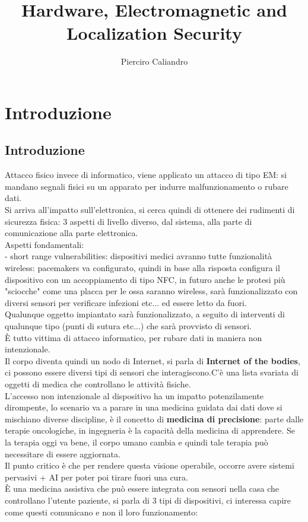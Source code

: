 \documentclass[oneside, 12pt]{extbook}
\title{Hardware, Electromagnetic and Localization Security}
\author{Pierciro Caliandro}
\begin{document}
\maketitle
\chapter{Introduzione}
\section{Introduzione}
Attacco fisico invece di informatico, viene applicato un attacco di tipo EM: si mandano segnali fisici su un apparato per indurre malfunzionamento o rubare dati.\\Si arriva all'impatto sull'elettronica, si cerca quindi di ottenere dei rudimenti di sicurezza fisica: 3 aspetti di livello diverso, dal sistema, alla parte di comunicazione alla parte elettronica.\\Aspetti fondamentali:\\
- short range vulnerabilities: dispositivi medici avranno tutte funzionalità wireless: pacemakers va configurato, quindi in base alla risposta configura il dispositivo con un accoppiamento di tipo NFC, in futuro anche le protesi più "sciocche" come una placca per le ossa saranno wireless, sarà funzionalizzato con diversi sensori per verificare infezioni etc... ed essere letto da fuori.\\Qualunque oggetto impiantato sarà funzionalizzato, a seguito di interventi di qualunque tipo (punti di sutura etc...) che sarà provvisto di sensori.\\È tutto vittima di attacco informatico, per rubare dati in maniera non intenzionale.\\Il corpo diventa quindi un nodo di Internet, si parla di \textbf{Internet of the bodies}, ci possono essere diversi tipi di sensori che interagiscono.C'è una lista svariata di oggetti di medica che controllano le attività fisiche.\\L'accesso non intenzionale al dispositivo ha un impatto potenzilamente dirompente, lo scenario va a parare in una medicina guidata dai dati dove si mischiano diverse discipline, è il concetto di \textbf{medicina di precisione}: parte dalle terapie oncologiche, in ingegneria è la capacità della medicina di apprendere. Se la terapia oggi va bene, il corpo umano cambia e quindi tale terapia può necessitare di essere aggiornata.\\Il punto critico è che per rendere questa visione operabile, occorre avere sistemi pervasivi + AI per poter poi tirare fuori una cura.\\È una medicina assistiva che può essere integrata con sensori nella casa che controllano l'utente paziente, si parla di 3 tipi di dispositivi, ci interessa capire come questi comunicano e non il loro funzionamento:
\end{document}
